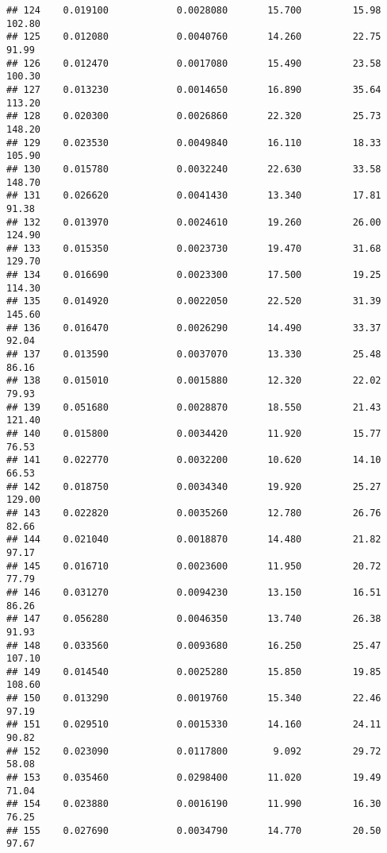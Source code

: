 \documentclass[
]{article}
\begin{document}
\begin{verbatim}
## 124    0.019100            0.0028080       15.700         15.98          102.80
## 125    0.012080            0.0040760       14.260         22.75           91.99
## 126    0.012470            0.0017080       15.490         23.58          100.30
## 127    0.013230            0.0014650       16.890         35.64          113.20
## 128    0.020300            0.0026860       22.320         25.73          148.20
## 129    0.023530            0.0049840       16.110         18.33          105.90
## 130    0.015780            0.0032240       22.630         33.58          148.70
## 131    0.026620            0.0041430       13.340         17.81           91.38
## 132    0.013970            0.0024610       19.260         26.00          124.90
## 133    0.015350            0.0023730       19.470         31.68          129.70
## 134    0.016690            0.0023300       17.500         19.25          114.30
## 135    0.014920            0.0022050       22.520         31.39          145.60
## 136    0.016470            0.0026290       14.490         33.37           92.04
## 137    0.013590            0.0037070       13.330         25.48           86.16
## 138    0.015010            0.0015880       12.320         22.02           79.93
## 139    0.051680            0.0028870       18.550         21.43          121.40
## 140    0.015800            0.0034420       11.920         15.77           76.53
## 141    0.022770            0.0032200       10.620         14.10           66.53
## 142    0.018750            0.0034340       19.920         25.27          129.00
## 143    0.022820            0.0035260       12.780         26.76           82.66
## 144    0.021040            0.0018870       14.480         21.82           97.17
## 145    0.016710            0.0023600       11.950         20.72           77.79
## 146    0.031270            0.0094230       13.150         16.51           86.26
## 147    0.056280            0.0046350       13.740         26.38           91.93
## 148    0.033560            0.0093680       16.250         25.47          107.10
## 149    0.014540            0.0025280       15.850         19.85          108.60
## 150    0.013290            0.0019760       15.340         22.46           97.19
## 151    0.029510            0.0015330       14.160         24.11           90.82
## 152    0.023090            0.0117800        9.092         29.72           58.08
## 153    0.035460            0.0298400       11.020         19.49           71.04
## 154    0.023880            0.0016190       11.990         16.30           76.25
## 155    0.027690            0.0034790       14.770         20.50           97.67

\end{verbatim}
\end{document}
